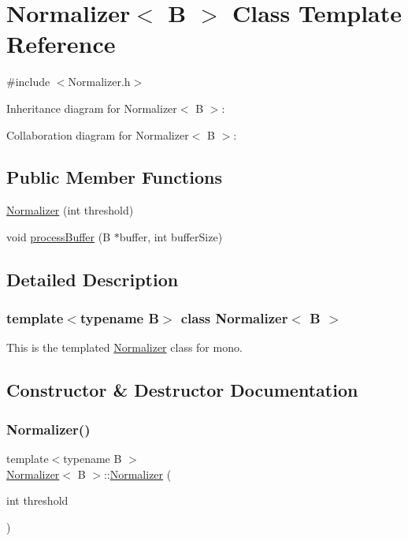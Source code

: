 \hypertarget{classNormalizer}{}\section{Normalizer$<$ B $>$ Class Template Reference}
\label{classNormalizer}


{\ttfamily \#include $<$Normalizer.\+h$>$}



Inheritance diagram for Normalizer$<$ B $>$\+:


Collaboration diagram for Normalizer$<$ B $>$\+:
\subsection*{Public Member Functions}
\begin{DoxyCompactItemize}
\item 
\hyperlink{classNormalizer_a213d7af2748d33103b4ce85021b160da}{Normalizer} (int threshold)
\item 
void \hyperlink{classNormalizer_a30a5a6459facb09f5dc2c7c0a0c335c8}{process\+Buffer} (B $\ast$buffer, int buffer\+Size)
\end{DoxyCompactItemize}


\subsection{Detailed Description}
\subsubsection*{template$<$typename B$>$\newline
class Normalizer$<$ B $>$}

This is the templated \hyperlink{classNormalizer}{Normalizer} class for mono. 

\subsection{Constructor \& Destructor Documentation}
\mbox{\label{classNormalizer_a213d7af2748d33103b4ce85021b160da}} 
\subsubsection{\texorpdfstring{Normalizer()}{Normalizer()}}
{\footnotesize\ttfamily template$<$typename B $>$ \\
\hyperlink{classNormalizer}{Normalizer}$<$ B $>$\+::\hyperlink{classNormalizer}{Normalizer} (\begin{DoxyParamCaption}\item[{int}]{threshold }\end{DoxyParamCaption})}

